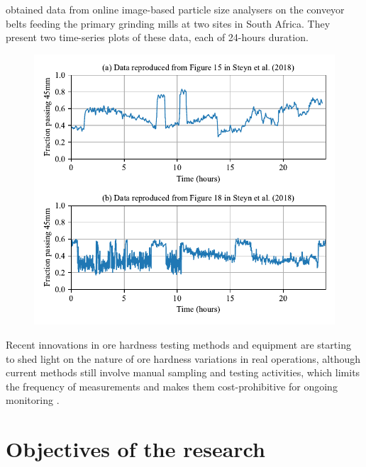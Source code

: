 \cite{steyn_investigating_2018} obtained data from online image-based particle size analysers on the conveyor belts feeding the primary grinding mills at two sites in South Africa. They present two time-series plots of these data, each of 24-hours duration. %
\begin{figure}[htp]
	\centering
	\includegraphics[width=13cm]{images/tsdata-steyn-figs.pdf}
	\caption{}
	\label{fig:ind-data-tsplots}
\end{figure}

Recent innovations in ore hardness testing methods and equipment are starting to shed light on the nature of ore hardness variations in real operations, although current methods still involve manual sampling and testing activities, which limits the frequency of measurements and makes them cost-prohibitive for ongoing monitoring \citep{kojovic_value_2019}.


\section{Objectives of the research} \label{sec:objectives}

